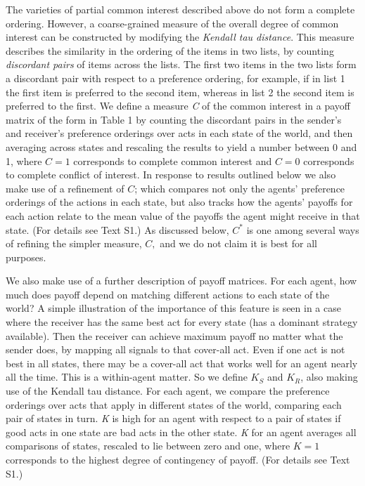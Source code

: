 \documentclass[10pt]{article}
\begin{document}
The varieties of partial common interest described above do not form a
complete ordering. However, a coarse-grained measure of the overall
degree of common interest can be constructed by modifying the
\emph{Kendall tau distance}. This measure describes the similarity in
the ordering of the items in two lists, by counting \emph{discordant
pairs} of items across the lists. The first two items in the two lists
form a discordant pair with respect to a preference ordering, for
example, if in list 1 the first item is preferred to the second item,
whereas in list 2 the second item is preferred to the first. We define a
measure \emph{C} of the common interest in a payoff matrix of the form
in Table 1 by counting the discordant pairs in the sender's and
receiver's preference orderings over acts in each state of the world, and
then averaging across states and rescaling the results to yield a number
between 0 and 1, where $C=1$ corresponds to complete common interest and
$C=0$ corresponds to complete conflict of interest. In response to
results outlined below we also make use of a refinement of $C$; which
compares not only the agents' preference orderings of the actions in
each state, but also tracks how the agents' payoffs for each action relate to the mean
value of the payoffs the agent might receive in that state. (For details see Text S1.) As discussed below, $C^*$ is one
among several ways of refining the simpler measure, $C,$ and we do not
claim it is best for all purposes.

We also make use of a further description of payoff matrices. For each
agent, how much does payoff depend on matching different actions to each
state of the world? A simple illustration of the importance of this
feature is seen in a case where the receiver has the same best act for
every state (has a dominant strategy available). Then the receiver can
achieve maximum payoff no matter what the sender does, by mapping all
signals to that cover-all act. Even if one act is not best in all
states, there may be a cover-all act that works well for an agent nearly
all the time. This is a within-agent matter. So we define $K_S$ and
$K_R$, also making use of the Kendall tau distance. For each agent, we
compare the preference orderings over acts that apply in different
states of the world, comparing each pair of states in turn. \emph{K} is
high for an agent with respect to a pair of states if good acts in one
state are bad acts in the other state. \emph{K} for an agent averages
all comparisons of states, rescaled to lie between zero and one, where
$K=1$ corresponds to the highest degree of contingency of payoff. (For
details see Text S1.)
\end{document}
